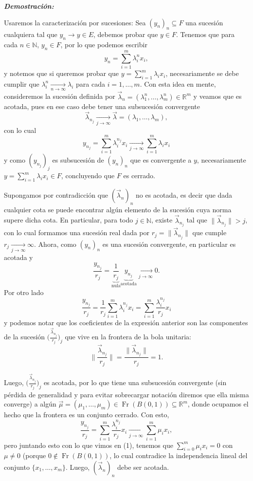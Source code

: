 \documentclass[letterpaper,10pt]{article}
\DeclareMathOperator{\fr}{Fr}
\newcommand{\N}{\mathbb{N}}
\newcommand{\R}{\mathbb{R}}
\newcommand{\dem}{\textbf{\emph{Demostraci\'on: }}}
\newcommand{\norm}[1]{\lVert #1\rVert }
\newcommand{\conv}[2]{\xrightarrow[#1\to#2]{}}
\begin{document}
\begin{enumerate}
\dem 

Usaremos la caracterización por sucesiones: Sea $(y_n)_n\subseteq F$ una sucesión cualquiera tal que $y_n\to y\in E$, debemos probar que $y\in F$. Tenemos que para cada $n\in\N$, $y_n\in F$, por lo que podemos escribir
\[y_n=\sum_{i=1}^m\lambda_{i}^nx_i,\]
y notemos que si queremos probar que $y=\sum_{i=1}^m\lambda_i x_i $, necesariamente se debe cumplir que $\lambda_i^n\conv{n}{\infty}\lambda_i$ para cada $i=1,\ldots,m$. Con esta idea en mente, consideremos la sucesión definida por $\vec{\lambda}_n=(\lambda_1^n,\ldots,\lambda_m^n)\in\R^m$ y veamos que es acotada, pues en ese caso debe tener una subsucesión convergente \[\vec{\lambda}_{n_j}\conv{j}{\infty}\vec{\lambda}=(\lambda_1,\ldots,\lambda_m),\]
con lo cual 
\[y_{n_j}=\sum_{i=1}^m\lambda_{i}^{n_j}x_i\conv{j}{\infty} \sum_{i=1}^m\lambda_i x_i\]
y como $(y_{n_j})_j$ es subsucesión de $(y_n)_n$ que es convergente a $y$, necesariamente $y=\sum_{i=1}^m\lambda_i x_i\in F$, concluyendo que $F$ es cerrado.

Supongamos por contradicción que $(\vec{\lambda}_n)_n$ no es acotada, es decir que dada cualquier cota se puede encontrar algún elemento de la sucesión cuya norma supere dicha cota. En particular, para todo $j\in\N$, existe $\vec{\lambda}_{n_j}$ tal que $\norm{\vec{\lambda}_{n_j}}>j$, con lo cual formamos una sucesión real dada por $r_j=\norm{\vec{\lambda}_{n_j}}$ que cumple $r_j\conv{j}{\infty}\infty$. Ahora, como $(y_n)_n$ es una sucesión convergente, en particular es acotada y
\begin{equation}
    \frac{y_{n_j}}{r_j}=\underbrace{\frac{1}{r_j}}_{\text{nula}}\underbrace{y_{n_j}}_{\text{acotada}}\conv{j}{\infty} 0. 
\end{equation}
Por otro lado
\[\frac{y_{n_j}}{r_j}=\frac{1}{r_j}\sum_{i=1}^m \lambda_i^{n_j}x_i=\sum_{i=1}^m \frac{\lambda_i^{n_j}}{r_j}x_i \]
y podemos notar que los coeficientes de la expresión anterior son las componentes de la sucesión $\Big(\frac{\vec{\lambda}_{n_j}}{r_j}\Big)_j$ que vive en la frontera de la bola unitaria:
\[\bigg\lVert\frac{\vec{\lambda}_{n_j}}{r_j}\bigg\rVert
=\frac{\norm{\vec{\lambda}_{n_j}}}{r_j}=1.\]

Luego, $\Big(\frac{\vec{\lambda}_{n_j}}{r_j}\Big)_j$ es acotada, por lo que tiene una subsucesión convergente (sin pérdida de generalidad y para evitar sobrecargar notación diremos que ella misma converge) a algún $\vec{\mu}=(\mu_1,\ldots,\mu_m)\in\fr(B(0,1))\subseteq\R^m$, donde ocupamos el hecho que la frontera es un conjunto cerrado. Con esto,
\[\frac{y_{n_j}}{r_j}=\sum_{i=1}^m \frac{\lambda_i^{n_j}}{r_j}x_i\conv{j}{\infty}\sum_{i=1}^m\mu_ix_i,\]
pero juntando esto con lo que vimos en (1), tenemos que $\sum_{i=0}^m\mu_ix_i=0$ con $\mu\neq0$ (porque $0\notin \fr(B(0,1))$, lo cual contradice la independencia lineal del conjunto $\{x_1,\ldots,x_m\}$. Luego, $(\vec{\lambda}_n)_n$ debe ser acotada.

\end{enumerate}	
\end{document}
